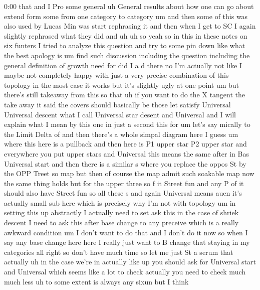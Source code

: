 \begin{unfinished}{0:00}
that  and  I  Pro  some  general  uh  General
results  about  how  one  can  go  about
extend  form  some  from  one  category  to
category
um  and
then  some  of  this  was  also  used  by  Lucas
Min  was  start  rephrasing  it  and  then
when  I  get  to  SC  I  again  slightly
rephrased  what  they  did  and  uh  uh  so
yeah  so  in  this  in  these  notes  on  six
funters  I  tried  to  analyze  this  question
and  try  to  some  pin  down  like  what  the
best  apology  is
um  find  such
discussion  including  the
question  including  the  general
definition  of  growth  need
for  did  I
a  d
there  no  I'm  actually
not  like  I  maybe  not  completely  happy
with  just  a  very  precise  combination  of
this  topology  in  the  most  case  it  works
but  it's  slightly  ugly  at  one  point
um  but  there's  still  takeaway  from  this
so  that  uh  if  you  want  to  do  the  X
tangent  the  take
away
it  said  the
covers  should  basically  be
those  let
satisfy  Universal  Universal  descent  what
I  call  Universal  star
desent  and
Universal  and  I  will  explain  what  I  mean
by  this  one  in  just  a  second
this
for
um  let's  say
mically  to  the
Limit
Delta
of
and  then  there's  a  whole  simpal  diagram
here  I
guess  um  where  this  here  is  a  pullback
and  then  here  is  P1  upper  star  P2  upper
star  and  everywhere  you  put  upper
stars  and
Universal  this  means  the  same  after  in
Bas  Universal
start
and  then  there  is  a  similar  s  where  you
replace  the  oppos  St  by  the  OPP  Treet  so
map  but  then  of
course  the  map  admit  such  soakable  map
now  the  same  thing  holds  but  for  the
upper
three  so  f  it  Street  fun  and  any  P  of  it
should  also  have  Street  fun  so  all  these
s  and  again  Universal  means
auen
it's  actually  small  sub  here  which  is
precisely  why  I'm  not  with  topology  um
in  setting  this  up  abstractly  I  actually
need  to  set  ask  this  in  the  case  of
shriek  descent  I  need  to  ask  this  after
base  change  to  any
preceive  which  is  a  really  awkward
condition  um  I  don't  want  to  do  that  and
I  don't  do  it
now  so  when  I  say  any  base  change  here
here  I  really  just  want
to  B  change  that  staying  in  my
categories
all  right  so  don't  have  much  time  so  let
me  just  St  a  serum  that
actually  uh  in  the  case  we're  in
actually  like  up  you  should  ask  for
Universal  start  and  Universal  which
seems  like  a  lot  to  check  actually  you
need  to  check  much  much  less  uh  to  some
extent  is  always  any  sixun  but  I  think

\end{unfinished}
